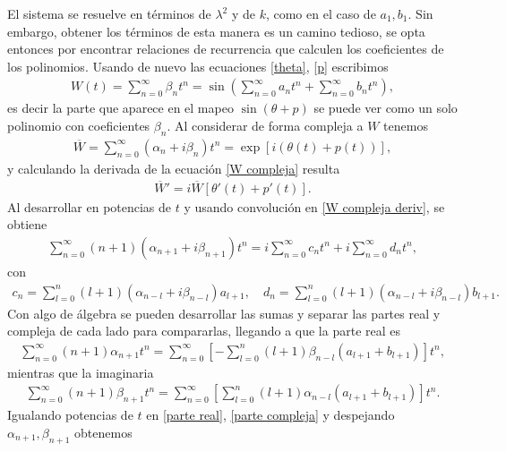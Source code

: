 El sistema se resuelve en términos de $\lambda^{2}$ y de $k$, como en el caso de $a_{1},b_{1}$. Sin embargo, obtener los términos de esta manera es un camino tedioso, se opta entonces por encontrar relaciones de recurrencia que calculen los coeficientes de los polinomios. Usando de nuevo las ecuaciones \eqref{theta}, \eqref{p} escribimos 
\begin{eqnarray}
W(t)=\sum_{n=0}^{\infty}\beta_{n}t^{n}=\sin\left(\sum_{n=0}^{\infty}a_{n}t^{n}+\sum_{n=0}^{\infty}
b_{n}t^{n}\right),
\end{eqnarray} 
es decir la parte que aparece en el mapeo $\sin(\theta+p)$ se puede ver como un solo polinomio con coeficientes $\beta_{n}$. Al considerar de forma compleja a $W$ tenemos
\begin{eqnarray}
\overline{W}=\sum_{n=0}^{\infty}(\alpha_{n}+i\beta_{n})t^{n}=\exp[i(\theta(t)+p(t))],
\label{W compleja}
\end{eqnarray}
y calculando la derivada de la ecuación \eqref{W compleja} resulta
\begin{eqnarray}
\overline{W}'=i\overline{W}[\theta '(t)+p'(t)].
\label{W compleja deriv}
\end{eqnarray}
Al desarrollar en potencias de $t$ y usando convolución en \eqref{W compleja deriv}, se obtiene
\begin{eqnarray}
\sum_{n=0}^{\infty}(n+1)(\alpha_{n+1}+i\beta_{n+1})t^{n}=i\sum_{n=0}^{\infty}c_{n}t^{n}+i\sum_{n=0}^{\infty}d_{n}t^{n},
\end{eqnarray}
con
\begin{eqnarray}
c_{n}=\sum_{l=0}^{n}(l+1)(\alpha_{n-l}+i\beta_{n-l})a_{l+1}, \quad
d_{n}=\sum_{l=0}^{n}(l+1)(\alpha_{n-l}+i\beta_{n-l})b_{l+1}.
\end{eqnarray}
Con algo de álgebra se pueden desarrollar las sumas y separar las partes real y compleja de cada lado para compararlas, llegando a que la parte real es
\begin{eqnarray}
\sum_{n=0}^{\infty}(n+1)\alpha_{n+1}t^{n}=\sum_{n=0}^{\infty}\left[-\sum_{l=0}^{n}(l+1)\beta_{n-l}(a_{l+1}+b_{l+1})\right]t^{n},
\label{parte real}
\end{eqnarray}
mientras que la imaginaria
\begin{eqnarray}
\sum_{n=0}^{\infty}(n+1)\beta_{n+1}t^{n}=\sum_{n=0}^{\infty}\left[\sum_{l=0}^{n}(l+1)\alpha_{n-l}(a_{l+1}+b_{l+1})\right]t^{n}.
\label{parte compleja}
\end{eqnarray}
Igualando potencias de $t$ en \eqref{parte real}, \eqref{parte compleja} y despejando $\alpha_{n+1},\beta_{n+1}$ obtenemos
